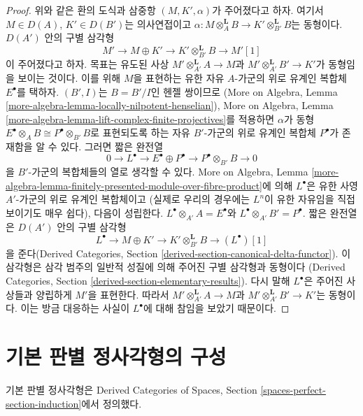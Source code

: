 \begin{proof}
\medskip\noindent
위와 같은 환의 도식과 삼중항 $(M, K', \alpha)$가 주어졌다고 하자.
여기서 $M \in D(A)$, $K' \in D(B')$는 의사연접이고
$\alpha : M \otimes_A^\mathbf{L} B \to
K' \otimes_{B'}^\mathbf{L} B$는 동형이다.
$D(A')$ 안의 구별 삼각형
$$
M' \to M \oplus K' \to K' \otimes_{B'}^\mathbf{L} B \to M'[1]
$$
이 주어졌다고 하자. 목표는 유도된 사상
$M' \otimes_{A'}^\mathbf{L} A \to M$과
$M' \otimes_{A'}^\mathbf{L} B' \to K'$가 동형임을 보이는 것이다.
이를 위해 $M$을 표현하는 유한 자유 $A$-가군의 위로 유계인 복합체
$E^\bullet$를 택하자. $(B', I)$는 $B = B'/I$인 헨젤 쌍이므로
(More on Algebra, Lemma
\ref{more-algebra-lemma-locally-nilpotent-henselian}), More on Algebra, Lemma
\ref{more-algebra-lemma-lift-complex-finite-projectives}를 적용하면
$\alpha$가 동형
$E^\bullet \otimes_A B \cong P^\bullet \otimes_{B'} B$로 표현되도록 하는
자유 $B'$-가군의 위로 유계인 복합체 $P^\bullet$가 존재함을 알 수 있다.
그러면 짧은 완전열
$$
0 \to L^\bullet \to
E^\bullet \oplus P^\bullet \to P^\bullet \otimes_{B'} B \to 0
$$
을 $B'$-가군의 복합체들의 열로 생각할 수 있다.
More on Algebra, Lemma
\ref{more-algebra-lemma-finitely-presented-module-over-fibre-product}에 의해
$L^\bullet$은 유한 사영 $A'$-가군의 위로 유계인 복합체이고
(실제로 우리의 경우에는 $L^n$이 유한 자유임을 직접 보이기도 매우 쉽다),
다음이 성립한다.
$L^\bullet \otimes_{A'} A = E^\bullet$와
$L^\bullet \otimes_{A'} B' = P^\bullet$.
짧은 완전열은 $D(A')$ 안의 구별 삼각형
$$
L^\bullet \to M \oplus K' \to
K' \otimes_{B'}^\mathbf{L} B \to (L^\bullet)[1]
$$
을 준다(Derived Categories, Section
\ref{derived-section-canonical-delta-functor}).
이 삼각형은 삼각 범주의 일반적 성질에 의해 주어진 구별 삼각형과 동형이다
(Derived Categories, Section \ref{derived-section-elementary-results}).
다시 말해 $L^\bullet$은 주어진 사상들과 양립하게 $M'$을 표현한다.
따라서 $M' \otimes_{A'}^\mathbf{L} A \to M$과
$M' \otimes_{A'}^\mathbf{L} B' \to K'$는 동형이다.
이는 방금 대응하는 사실이 $L^\bullet$에 대해 참임을 보았기 때문이다.
\end{proof}

\section{기본 판별 정사각형의 구성}
\label{section-elementary-dsitnguished-squares}

\noindent
기본 판별 정사각형은 Derived Categories of Spaces, Section
\ref{spaces-perfect-section-induction}에서 정의했다.

